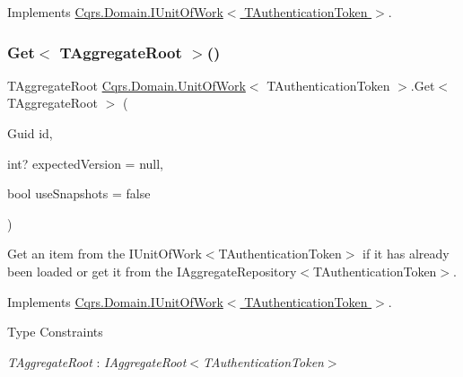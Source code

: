 Implements \hyperlink{interfaceCqrs_1_1Domain_1_1IUnitOfWork_ade600c9bf9e8380c24eaf1e7e0df6e01_ade600c9bf9e8380c24eaf1e7e0df6e01}{Cqrs.\+Domain.\+I\+Unit\+Of\+Work$<$ T\+Authentication\+Token $>$}.

\mbox{\label{classCqrs_1_1Domain_1_1UnitOfWork_a0592865d52ba0eafb9a5ad1fbdad9729_a0592865d52ba0eafb9a5ad1fbdad9729}} 
\subsubsection{\texorpdfstring{Get$<$ T\+Aggregate\+Root $>$()}{Get< TAggregateRoot >()}}
{\footnotesize\ttfamily T\+Aggregate\+Root \hyperlink{classCqrs_1_1Domain_1_1UnitOfWork}{Cqrs.\+Domain.\+Unit\+Of\+Work}$<$ T\+Authentication\+Token $>$.Get$<$ T\+Aggregate\+Root $>$ (\begin{DoxyParamCaption}\item[{Guid}]{id,  }\item[{int?}]{expected\+Version = {\ttfamily null},  }\item[{bool}]{use\+Snapshots = {\ttfamily false} }\end{DoxyParamCaption})}



Get an item from the I\+Unit\+Of\+Work$<$\+T\+Authentication\+Token$>$ if it has already been loaded or get it from the I\+Aggregate\+Repository$<$\+T\+Authentication\+Token$>$. 



Implements \hyperlink{interfaceCqrs_1_1Domain_1_1IUnitOfWork_aee78f81d472577a65356bc1c05207180_aee78f81d472577a65356bc1c05207180}{Cqrs.\+Domain.\+I\+Unit\+Of\+Work$<$ T\+Authentication\+Token $>$}.

\begin{Desc}
\item[Type Constraints]\begin{description}
\item[{\em T\+Aggregate\+Root} : {\em I\+Aggregate\+Root$<$T\+Authentication\+Token$>$}]\end{description}
\end{Desc}
